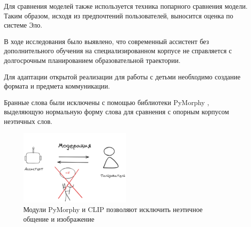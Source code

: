 Для сравнения моделей также используется техника попарного сравнения модели. 
Таким образом, исходя из предпочтений пользователей, выносится оценка по системе Эло.

В ходе исследования было выявлено, что современный ассистент без дополнительного обучения на специализированном 
корпусе не справляется с долгосрочным планированием образовательной траектории.

Для адаптации открытой реализации для работы с детьми необходимо создание формата и предмета коммуникации.

Бранные слова были исключены с помощью библиотеки PyMorphy \cite{Korobov2015morph}, выделяющую нормальную форму слова для сравнения
с опорным корпусом неэтичных слов.

\begin{figure}[h]
    \centering
    \includegraphics[width=0.5\textwidth]{assets/work/arch/detox.excalidraw.png}
    \caption{Модули PyMorphy \cite{Korobov2015morph} и CLIP позволяют исключить неэтичное общение и изображение }
    \label{detox}
\end{figure}








